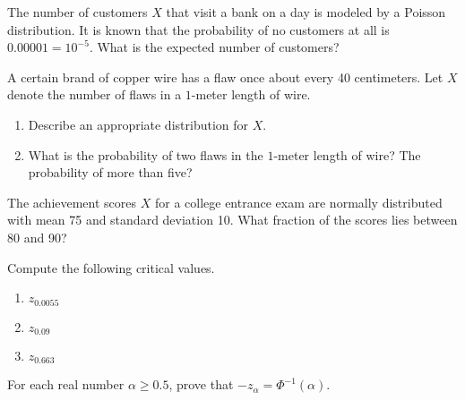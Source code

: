\documentclass[12pt,reqno]{amsart}
\begin{document}
\bigskip
\prob The number of customers $X$ that visit a bank on a day is modeled by a Poisson distribution. It is known that the probability of no customers at all is $0.00001 = 10^{-5}$. What is the expected number of customers?\vfill













\bigskip
\prob A certain brand of copper wire has a flaw once about every 40 centimeters. Let $X$ denote the number of flaws in a $1$-meter length of wire.

\medskip
\begin{enumerate}
\item Describe an appropriate distribution for $X$.\vfill



\item What is the probability of two flaws in the $1$-meter length of wire? The probability of more than five?\vfill


\end{enumerate}












\newpage
\prob The achievement scores $X$ for a college entrance exam are normally distributed with mean 75 and standard deviation 10. What fraction of the scores lies between 80 and 90?\vfill















\bigskip
\prob Compute the following critical values.

\medskip
\begin{enumerate}
\item $z_{0.0055}$\vfill
\item $z_{0.09}$\vfill
\item $z_{0.663}$\vfill
\end{enumerate}




\bigskip
\prob For each real number $\alpha\geq 0.5$, prove that $-z_\alpha = \Phi^{-1}(\alpha)$.\vfill
\end{document}
